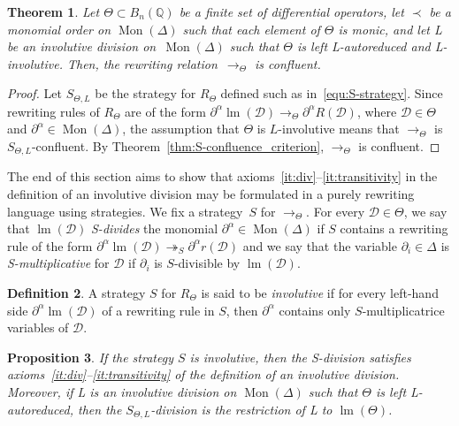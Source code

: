 \documentclass[10pt]{easychair}
\newtheorem{theorem}{Theorem}[section]
\newtheorem{proposition}[theorem]{Proposition}
\theoremstyle{definition}
\newtheorem{definition}[theorem]{Definition}
\newcommand\D{\mathcal{D}}
\DeclareMathOperator{\lm}{lm}
\newcommand\Q{\mathbb{Q}}
\newcommand\Weyl[1]{B_{#1}(\Q)}
\newcommand\monBasis{\Mon(\Delta)}
\DeclareMathOperator{\Mon}{Mon}
\newcommand\rewS{\twoheadrightarrow_S}
\newcommand\rewTheta{\to_\Theta}
\newcommand\RTheta{R_{\Theta}}
\newcommand\SThetaL{S_{\Theta,L}}
\begin{document}
\begin{theorem}
  Let $\Theta\subset\Weyl{n}$ be a finite set of differential operators,
  let $\prec$ be a monomial order on $\monBasis$ such that each element
  of $\Theta$ is monic, and let L be an involutive division 
  on~$\monBasis$ such that $\Theta$ is left L-autoreduced and
  L-involutive. Then, the rewriting relation~$\rewTheta$ is confluent.
\end{theorem}

\begin{proof}
  Let $\SThetaL$ be the strategy for $\RTheta$ defined such as
  in~\eqref{equ:S-strategy}. Since rewriting rules of $\RTheta$ are of
  the form $\partial^\alpha\lm(\D)\rewTheta\partial^\alpha R(\D)$, where
  $\D\in\Theta$ and $\partial^\alpha\in\monBasis$, the assumption that
  $\Theta$ is $L$-involutive means that $\rewTheta$ is
  $\SThetaL$-confluent. By Theorem~\ref{thm:S-confluence_criterion},
  $\rewTheta$ is confluent.
\end{proof}
\medskip

The end of this section aims to show that
axioms~\ref{it:div}--\ref{it:transitivity} in the definition of an
involutive division may be formulated in a purely rewriting language
using strategies. We fix a strategy~$S$ for $\rewTheta$. For every
$\D\in\Theta$, we say that $\lm(\D)$ {\em S-divides} the monomial
$\partial^\alpha\in\monBasis$ if $S$ contains a rewriting rule of the
form $\partial^\alpha\lm(\D)\rewS\partial^\alpha r(\D)$ and we say that
the variable $\partial_i\in\Delta$ is {\em S-multiplicative} for $\D$ if
$\partial_i$ is $S$-divisible by $\lm(\D)$. 
\smallskip

\begin{definition}
  A strategy $S$ for $\RTheta$ is said to be {\em involutive} if for
  every left-hand side $\partial^\alpha\lm(\D)$ of a rewriting rule in
  $S$, then $\partial^\alpha$ contains only $S$-multiplicatrice variables
  of $\D$.
\end{definition}
\smallskip

\begin{proposition}
  If the strategy $S$ is involutive, then the S-division satisfies
  axioms~\ref{it:div}--\ref{it:transitivity} of the definition of an
  involutive division. Moreover, if L is an involutive division on
  $\monBasis$ such that $\Theta$ is left L-autoreduced, then the
  $\SThetaL$-division is the restriction of L to $\lm(\Theta)$.
\end{proposition}
\end{document}
